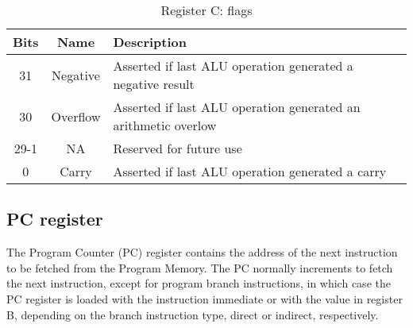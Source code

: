 \begin{table}[!htbp]
  \centering
    \begin{tabular}{|c|c|p{7cm}|}
    \hline 
    {\bf Bits} & {\bf Name} & {\bf Description} \\
    \hline \hline 
     31 & Negative & Asserted if last ALU operation generated a negative result\\
    \hline
     30 & Overflow &  Asserted if last ALU operation generated an arithmetic overlow\\
     29-1 & NA & Reserved for future use\\
    \hline
     0 & Carry & Asserted if last ALU operation generated a carry\\
    \hline
    \hline

    \end{tabular}
  \caption{Register C: flags}
  \label{tab:flags}
\end{table}


\subsection{PC register}

The Program Counter (PC) register contains the address of the next instruction
to be fetched from the Program Memory. The PC normally increments to fetch the
next instruction, except for program branch instructions, in which case the PC
register is loaded with the instruction immediate or with the value in register
B, depending on the branch instruction type, direct or indirect, respectively.


